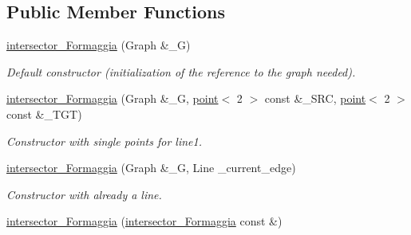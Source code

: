 \subsection*{Public Member Functions}
\begin{DoxyCompactItemize}
\item 
\hypertarget{classintersector__Formaggia_aeffcde446e6844c6b9976a68603463b4}{
\hyperlink{classintersector__Formaggia_aeffcde446e6844c6b9976a68603463b4}{intersector\_\-Formaggia} (Graph \&\_\-G)}
\label{classintersector__Formaggia_aeffcde446e6844c6b9976a68603463b4}

\begin{DoxyCompactList}\small\item\em Default constructor (initialization of the reference to the graph needed). \item\end{DoxyCompactList}\item 
\hypertarget{classintersector__Formaggia_a0c6204a75a7c69943498a08df38457c6}{
\hyperlink{classintersector__Formaggia_a0c6204a75a7c69943498a08df38457c6}{intersector\_\-Formaggia} (Graph \&\_\-G, \hyperlink{classpoint}{point}$<$ 2 $>$ const \&\_\-SRC, \hyperlink{classpoint}{point}$<$ 2 $>$ const \&\_\-TGT)}
\label{classintersector__Formaggia_a0c6204a75a7c69943498a08df38457c6}

\begin{DoxyCompactList}\small\item\em Constructor with single points for line1. \item\end{DoxyCompactList}\item 
\hypertarget{classintersector__Formaggia_a69563ae4df7cea055cfae0931b9de712}{
\hyperlink{classintersector__Formaggia_a69563ae4df7cea055cfae0931b9de712}{intersector\_\-Formaggia} (Graph \&\_\-G, Line \_\-current\_\-edge)}
\label{classintersector__Formaggia_a69563ae4df7cea055cfae0931b9de712}

\begin{DoxyCompactList}\small\item\em Constructor with already a line. \item\end{DoxyCompactList}\item 
\hypertarget{classintersector__Formaggia_aeb5fb9445f85267c8bc97596b9ef524c}{
\hyperlink{classintersector__Formaggia_aeb5fb9445f85267c8bc97596b9ef524c}{intersector\_\-Formaggia} (\hyperlink{classintersector__Formaggia}{intersector\_\-Formaggia} const \&)}
\label{classintersector__Formaggia_aeb5fb9445f85267c8bc97596b9ef524c}


\end{DoxyCompactItemize}
